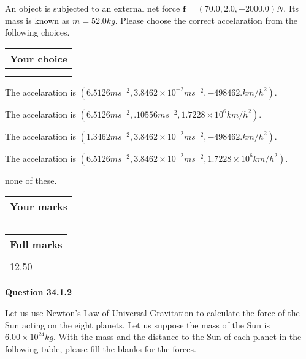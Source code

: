 \documentclass[12pt]{article}
\begin{document}
  
 
An object is subjected to an external net force $\mathbf{f}=(
70.0 ,
2.0,
-2000.0  )N$. Its mass is known as
$m= %
52.0  kg$. Please choose the correct accelaration
from the following choices.
 
  
  
\noindent\hspace{3.0in} \begin{tabular}{|l|}
\hline
Your choice \\
\hline
 \\ 
 \\ 
\hline
\end{tabular}
  
  
 
 
The accelaration is
$(
6.5126ms^{-2},
3.8462 \times 10^{-2}ms^{-2},
-498462.km/h^2
).
$
 
 
The accelaration is
$(
6.5126ms^{-2},
.10556ms^{-2},
1.7228 \times 10^{6}km/h^2
).
$
 
 
The accelaration is
$(
1.3462ms^{-2},
3.8462 \times 10^{-2}ms^{-2},
-498462.km/h^2
).
$
 
 
The accelaration is
$(
6.5126ms^{-2},
3.8462 \times 10^{-2}ms^{-2},
1.7228 \times 10^{6}km/h^2
).
$
 
 
none of these.
 
 
 
 

 
\vspace{0.3in}
  
\vspace{0.2in}
  
         \begin{tabular}{|l|}
\hline
 Your marks  \\
\hline
 \\ 
 \\ 
\hline
\end{tabular}
\hspace{0.05in} \begin{tabular}{|l|}
\hline
 Full marks  \\
\hline
 \\ 
12.50 \\
\hline
\end{tabular}
{\textbf{\Large{Question
34.1.2 
}}}
  
  
Let us use Newton's Law of Universal Gravitation to calculate the force
of the Sun acting on the eight planets. Let us suppose the mass of the
Sun is $ %
6.00 \times 10^{24} kg$. With the mass and the
distance to the Sun of each planet in the following table, please fill
the blanks for the forces.
 
\end{document}
